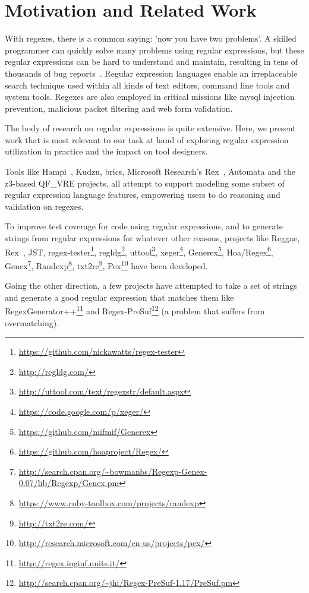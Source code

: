 \section{Motivation and Related Work}
\label{sec:motivation}

With regexes, there is a common saying: 'now you have two problems'.
A skilled programmer can quickly solve many problems using regular expressions, but these regular expressions can be hard to understand and maintain, resulting in tens of thousands of bug reports~\cite{Spishak:2012:TSR:2318202.2318207}.
Regular expression languages enable an irreplaceable search technique used within all kinds of text editors, command line tools and system tools.
Regexes are also employed in critical missions like mysql injection prevention, malicious packet filtering  and web form validation. 

The body of research on regular expressions is quite extensive. Here, we present work that is most relevant to our task at hand of exploring regular expression utilization in practice and the impact on tool designers. 

Tools like Hampi~\cite{hampi}, Kudzu, brics\cite{brics}, Microsoft Research's Rex~\cite{rex}, Automata and the z3-based QF\_VRE projects, all attempt to support modeling some subset of regular expression language features, empowering users to do reasoning and validation on regexes.

To improve test coverage for code using regular expressions, and to generate strings from regular expressions for whatever other reasons, projects like Reggae, Rex~\cite{rex}, JST, regex-tester\footnote{\url{https://github.com/nickawatts/regex-tester}}, regldg\footnote{\url{http://regldg.com/}},
uttool\footnote{\url{http://uttool.com/text/regexstr/default.aspx}}, xeger\footnote{\url{https://code.google.com/p/xeger/}}, Generex\footnote{\url{https://github.com/mifmif/Generex}}, Hoa/Regex\footnote{\url{https://github.com/hoaproject/Regex/}}, Genex\footnote{\url{http://search.cpan.org/~bowmanbs/Regexp-Genex-0.07/lib/Regexp/Genex.pm}}, Randexp\footnote{\url{https://www.ruby-toolbox.com/projects/randexp}}, txt2re\footnote{\url{http://txt2re.com/}}, Pex\footnote{\url{http://research.microsoft.com/en-us/projects/pex/}}  have been developed.

Going the other direction, a few projects have attempted to take a set of strings and generate a good regular expression that matches them like RegexGenerator++\footnote{\url{http://regex.inginf.units.it/}} and Regex-PreSuf\footnote{\url{http://search.cpan.org/~jhi/Regex-PreSuf-1.17/PreSuf.pm}} (a problem that suffers from overmatching).


